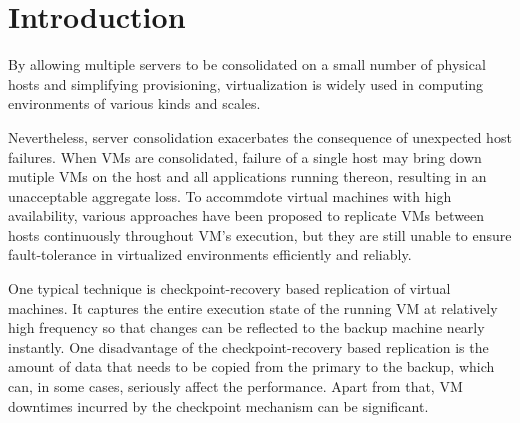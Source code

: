 \section{Introduction} \label{sec:intro}


By allowing multiple servers to be consolidated on a small number of physical hosts 
and simplifying provisioning, virtualization is widely used in computing environments 
of various kinds and scales.

Nevertheless, server consolidation exacerbates the consequence of unexpected host failures. 
When VMs are consolidated, failure of a single host may bring down mutiple VMs on the host 
and all applications running thereon, resulting in an unacceptable aggregate loss. 
To accommdote virtual machines with high availability, various approaches have been 
proposed to replicate VMs between hosts continuously throughout VM's execution, but 
they are still unable to ensure fault-tolerance in virtualized environments efficiently 
and reliably. 

One typical technique is checkpoint-recovery based replication of virtual 
machines. It captures the entire execution state of the running VM at relatively 
high frequency so that changes can be reflected to the backup machine nearly instantly. 
One disadvantage of the checkpoint-recovery based replication is the amount of data that 
needs to be copied from the primary to the backup, which can, in some cases, seriously 
affect the performance. Apart from that, VM downtimes incurred by the checkpoint mechanism 
can be significant.




